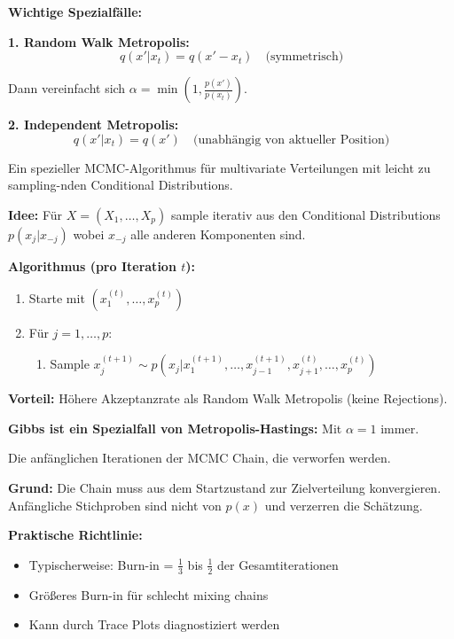 \textbf{Wichtige Spezialfälle:}

\textbf{1. Random Walk Metropolis:}
$$q(x' | x_t) = q(x' - x_t) \quad \text{(symmetrisch)}$$

Dann vereinfacht sich $\alpha = \min(1, \frac{p(x')}{p(x_t)})$.

\textbf{2. Independent Metropolis:}
$$q(x' | x_t) = q(x') \quad \text{(unabhängig von aktueller Position)}$$

Ein spezieller MCMC-Algorithmus für multivariate Verteilungen mit leicht zu sampling-nden Conditional Distributions.

\textbf{Idee:} Für $X = (X_1, \ldots, X_p)$ sample iterativ aus den Conditional Distributions $p(x_j | x_{-j})$ wobei $x_{-j}$ alle anderen Komponenten sind.

\textbf{Algorithmus (pro Iteration $t$):}

\begin{enumerate}[leftmargin=1.5em]
    \item Starte mit $(x_1^{(t)}, \ldots, x_p^{(t)})$
    \item Für $j = 1, \ldots, p$:
    \begin{enumerate}[leftmargin=1.5em]
        \item Sample $x_j^{(t+1)} \sim p(x_j | x_1^{(t+1)}, \ldots, x_{j-1}^{(t+1)}, x_{j+1}^{(t)}, \ldots, x_p^{(t)})$
    \end{enumerate}
\end{enumerate}

\textbf{Vorteil:} Höhere Akzeptanzrate als Random Walk Metropolis (keine Rejections).

\textbf{Gibbs ist ein Spezialfall von Metropolis-Hastings:} Mit $\alpha = 1$ immer.

Die anfänglichen Iterationen der MCMC Chain, die verworfen werden.

\textbf{Grund:} Die Chain muss aus dem Startzustand zur Zielverteilung konvergieren. Anfängliche Stichproben sind nicht von $p(x)$ und verzerren die Schätzung.

\textbf{Praktische Richtlinie:}
\begin{itemize}[leftmargin=1.5em]
    \item Typischerweise: Burn-in = $\frac{1}{3}$ bis $\frac{1}{2}$ der Gesamtiterationen
    \item Größeres Burn-in für schlecht mixing chains
    \item Kann durch Trace Plots diagnostiziert werden
\end{itemize}

